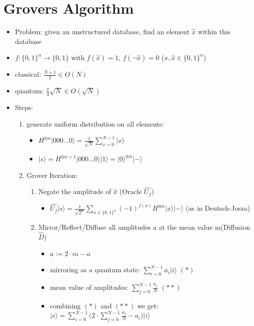 \documentclass[12pt,a4paper]{article}
\newcommand{\ecb}[1]{\{#1\}}
\newcommand{\ket}[1]{\vert #1 \rangle}
\begin{document}
\section{Grovers Algorithm}
\begin{itemize}
\item Problem: given an unstructured database, find an element $\hat{x}$ within this database
\item $f : \ecb{0,1}^n \rightarrow \ecb{0,1}$ with $f(\hat{x}) = 1$, $f(\lnot \hat{x}) = 0$ \hspace{1cm}($x, \hat{x} \in \ecb{0,1}^n$)
\item classical: $\frac{N+1}{2} \in O(N)$
\item quantum: $\frac{\pi}{4}\sqrt{N} \in O(\sqrt{N})$
\item Steps:
\begin{enumerate}
\item generate uniform distribution on all elements:\\
\begin{itemize}
\item $\displaystyle H^{\otimes n}\ket{000...0}=\frac{1}{\sqrt{N}} \sum_{x=0}^{N-1} \ket{x}$
\item $\displaystyle\ket{s} = H^{\otimes n+1} \ket{000...0}\ket{1} = \ket{0}^{\otimes n}\ket{-}$
\end{itemize}
\item Grover Iteration:
\begin{enumerate}
\item Negate the amplitude of $\hat{x}$ (Oracle $\hat{U_f}$)
\begin{itemize}
\item $\displaystyle \hat{U_f}\ket{s} = \frac{1}{\sqrt{2^n}} \sum_{x\in\ecb{0,1}^n} (-1)^{f(x)}H^{\otimes n}\ket{x}\ket{-}$ \hspace{0.2cm}(as in Deutsch-Josza)
\end{itemize}
\item Mirror/Reflect/Diffuse all amplitudes a at the mean value m(Diffusion $\hat{D}$)
\begin{itemize}
\item $a := 2\cdot m - a$
\item mirroring as a quantum state: $\displaystyle \sum_{i=0}^{N-1} a_i \ket{i}$ $(\ast)$
\item mean value of amplitudes: $\displaystyle \sum_{j=0}^{N-1} \frac{a_j}{N}$ $(\ast\ast)$
\item combining $(\ast)$ and $(\ast\ast)$ we get: $\displaystyle\ket{s} = \sum_{i=0}^{N-1} \bigg( 2\cdot \sum_{j=0}^{N-1} \frac{a_j}{N}-a_i\bigg) \ket{i}$

\end{itemize}
\end{enumerate}
\end{enumerate}
\end{itemize}
\end{document}
